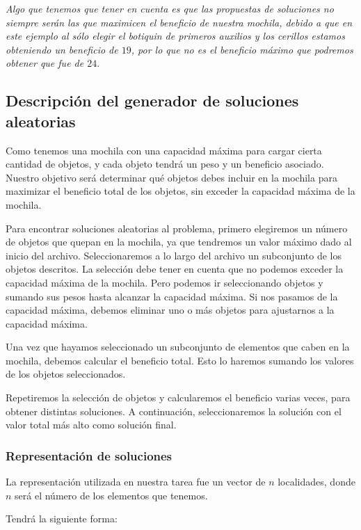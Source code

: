 \documentclass{article}
\begin{document}
\textit{Algo que tenemos que tener en cuenta es que las propuestas de soluciones no siempre serán las que maximicen el beneficio de nuestra mochila, debido a que en este ejemplo al sólo elegir el botiquin de primeros auxilios y los cerillos estamos obteniendo un beneficio de $19$, por lo que no es el beneficio máximo que podremos obtener que fue de $24$}.

\subsection*{Descripción del generador de soluciones aleatorias}
Como tenemos una mochila con una capacidad máxima para cargar cierta cantidad de objetos, y cada objeto tendrá un peso y un beneficio asociado. Nuestro objetivo será determinar qué objetos debes incluir en la mochila para maximizar el beneficio total de los objetos, sin exceder la capacidad máxima de la mochila.

Para encontrar soluciones aleatorias al problema, primero elegiremos un número de objetos que quepan en la mochila, ya que tendremos un valor máximo dado al inicio del archivo. Seleccionaremos a lo largo del archivo un subconjunto de los objetos descritos. La selección debe tener en cuenta que no podemos exceder la capacidad máxima de la mochila. Pero podemos ir seleccionando objetos y sumando sus pesos hasta alcanzar la capacidad máxima. Si nos pasamos de la capacidad máxima, debemos eliminar uno o más objetos para ajustarnos a la capacidad máxima.

Una vez que hayamos seleccionado un subconjunto de elementos que caben en la mochila, debemos calcular el beneficio total. Esto lo haremos sumando los valores de los objetos seleccionados.

Repetiremos la selección de objetos y calcularemos el beneficio varias veces, para obtener distintas soluciones. A continuación, seleccionaremos  la solución con el valor total más alto como solución final.

\subsubsection*{Representación de soluciones}
La representación utilizada en nuestra tarea fue un vector de $n$ localidades, donde $n$ será el número de los elementos que tenemos.

Tendrá la siguiente forma:

\begin{equation*}
[x_1, x_2, x_3, \dots x_n]
\end{equation*}
\end{document}

